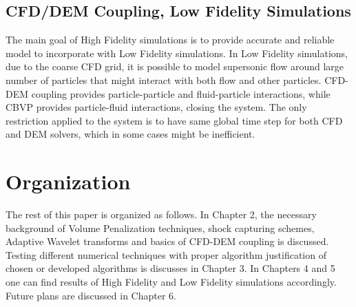 \subsection{CFD/DEM Coupling, Low Fidelity Simulations}
The main goal of High Fidelity simulations is to provide accurate and reliable model to incorporate with Low Fidelity simulations. In Low Fidelity simulations, due to the coarse CFD grid, it is possible to model supersonic flow around large number of particles that might interact with both flow and other particles. CFD-DEM coupling provides particle-particle and fluid-particle interactions, while CBVP provides particle-fluid interactions, closing the system. The only restriction applied to the system is to have same global time step for both CFD and DEM solvers, which in some cases might be inefficient.


\section{Organization}
The rest of this paper is organized as follows. In Chapter 2, the necessary background of Volume Penalization techniques, shock capturing schemes, Adaptive Wavelet transforms and basics of CFD-DEM coupling is discussed. Testing different numerical techniques with proper algorithm justification of chosen or developed algorithms is discusses in Chapter 3. In Chapters 4 and 5 one can find results of High Fidelity and Low Fidelity simulations accordingly. Future plans are discussed in Chapter 6.
